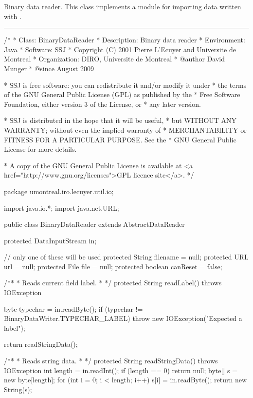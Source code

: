
Binary data reader. This class implements a module for importing data written
 with .

\bigskip\hrule

\begin{code}
\begin{hide}
/*
 * Class:        BinaryDataReader
 * Description:  Binary data reader
 * Environment:  Java
 * Software:     SSJ
 * Copyright (C) 2001  Pierre L'Ecuyer and Universite de Montreal
 * Organization: DIRO, Universite de Montreal
 * @author       David Munger
 * @since        August 2009

 * SSJ is free software: you can redistribute it and/or modify it under
 * the terms of the GNU General Public License (GPL) as published by the
 * Free Software Foundation, either version 3 of the License, or
 * any later version.

 * SSJ is distributed in the hope that it will be useful,
 * but WITHOUT ANY WARRANTY; without even the implied warranty of
 * MERCHANTABILITY or FITNESS FOR A PARTICULAR PURPOSE.  See the
 * GNU General Public License for more details.

 * A copy of the GNU General Public License is available at
   <a href="http://www.gnu.org/licenses">GPL licence site</a>.
 */
\end{hide}
package umontreal.iro.lecuyer.util.io;\begin{hide}
import java.io.*;
import java.net.URL;
\end{hide}


public class BinaryDataReader extends AbstractDataReader \begin{hide} {
   protected DataInputStream in;

   // only one of these will be used
   protected String filename           = null;
   protected URL url                   = null;
   protected File file                 = null;
   protected boolean canReset = false;

   /**
    * Reads current field label.
    *
    */
   protected String readLabel() throws IOException {

      byte typechar = in.readByte();
      if (typechar != BinaryDataWriter.TYPECHAR_LABEL)
         throw new IOException("Expected a label");

      return readStringData();
   }


   /**
    * Reads string data.
    *
    */
   protected String readStringData() throws IOException {
      int length = in.readInt();
      if (length == 0)
         return null;
      byte[] s = new byte[length];
      for (int i = 0; i < length; i++)
         s[i] = in.readByte();
      return new String(s);
   }

}
\end{hide}
\end{code}
